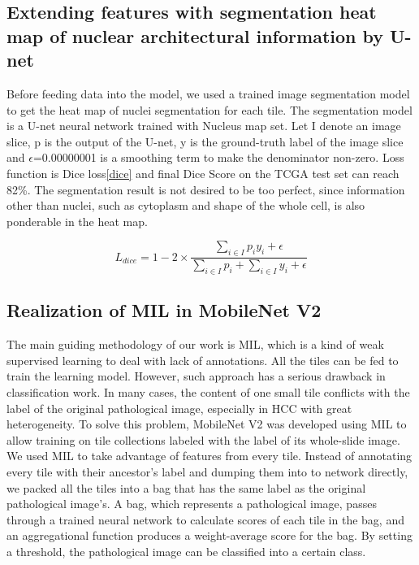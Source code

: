 \documentclass{article}
\begin{document}
\subsection{Extending features with segmentation heat map of nuclear architectural information by U-net}
Before feeding data into the model, we used a trained image segmentation model to get the heat map of nuclei segmentation for each tile. The segmentation model is a U-net neural network trained with Nucleus map set. Let I denote an image slice, p is the output of the U-net, y is the ground-truth label of the image slice and $\epsilon$=0.00000001 is a smoothing term to make the denominator non-zero. Loss function is Dice loss\ref{dice} and final Dice Score on the TCGA test set can reach 82\%. The segmentation result is not desired to be too perfect, since information other than nuclei, such as cytoplasm and shape of the whole cell, is also ponderable in the heat map.

\begin{equation}
	\label{dice}
	L_{dice} = 1-2\times \frac{\sum_{i \in I}{p_i y_i}+\epsilon}{\sum_{i \in I}{p_i} + \sum_{i \in I}{y_i} + \epsilon}
\end{equation}

\subsection{Realization of MIL in MobileNet V2}
The main guiding methodology of our work is MIL, which is a kind of weak supervised learning to deal with lack of annotations. All the tiles can be fed to train the learning model. However, such approach has a serious drawback in classification work. In many cases, the content of one small tile conflicts with the label of the original pathological image, especially in HCC with great heterogeneity. To solve this problem, MobileNet V2 was developed using MIL to allow training on tile collections labeled with the label of its whole-slide image. We used MIL to take advantage of features from every tile. Instead of annotating every tile with their ancestor’s label and dumping them into to network directly, we packed all the tiles into a bag that has the same label as the original pathological image’s. A bag, which represents a pathological image, passes through a trained neural network to calculate scores of each tile in the bag, and an aggregational function produces a weight-average score for the bag. By setting a threshold, the pathological image can be classified into a certain class.
\end{document}
